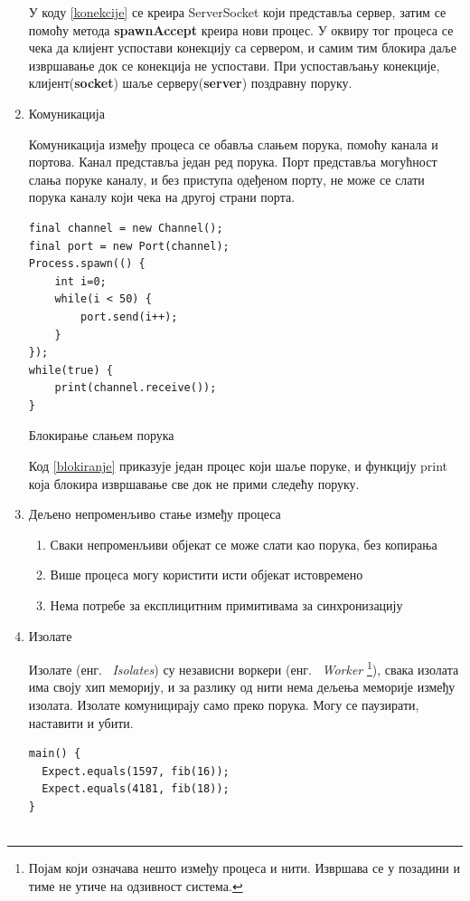\documentclass[12pt,oneside]{memoir}
\begin{document}
\begin{enumerate}
У коду \ref{konekcije} се креира ServerSocket који представља сервер, затим се помоћу метода \textbf{spawnAccept} креира нови процес. У оквиру тог процеса се чека да клијент успостави конекцију са сервером, и самим тим блокира даље извршавање док се конекција не успостави. При успостављању конекције, клијент(\textbf{socket}) шаље серверу(\textbf{server}) поздравну поруку.

\item Комуникација

Комуникација између процеса се обавља слањем порука, помоћу канала и портова. Канал представља један ред порука. Порт представља могућност слања поруке каналу, и без приступа одеђеном порту, не може се слати порука каналу који чека на другој страни порта.

\begin{listing}
\begin{verbatim}
final channel = new Channel();
final port = new Port(channel);
Process.spawn(() {
	int i=0;
	while(i < 50) {
		port.send(i++);
	}
});
while(true) {
	print(channel.receive());
}
\end{verbatim}
\caption{Блокирање слањем порука}
\label{blokiranje}
\end{listing}
Код \ref{blokiranje} приказује један процес који шаље поруке, и функцију print која блокира извршавање све док не прими следећу поруку.

\item Дељено непроменљиво стање између процеса
\begin{enumerate}
\item Сваки непроменљиви објекат се може слати као порука, без копирања
\item Више процеса могу користити исти објекат истовремено
\item Нема потребе за експлицитним примитивама за синхронизацију
\end{enumerate}

\item Изолате

Изолате (енг. ~\textit{Isolates}) су независни воркери (енг. ~\textit{Worker} \footnote{Појам који означава нешто између процеса и нити. Извршава се у позадини и тиме не утиче на одзивност система. }), свака изолата има своју хип меморију, и за разлику од нити нема дељења меморије између изолата. Изолате комуницирају само преко порука. Могу се паузирати, наставити и убити.

\begin{listing}
\begin{verbatim}
main() {
  Expect.equals(1597, fib(16));
  Expect.equals(4181, fib(18)); 
}


\end{verbatim}
\end{listing}
\end{enumerate}
\end{document}
